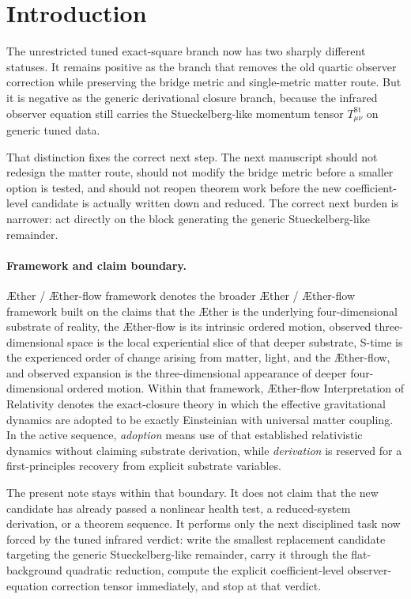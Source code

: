 \documentclass[11pt]{article}
\newcommand{\Aether}{\AE{}ther}
\newcommand{\Aflow}{\AE{}ther-flow}
\newcommand{\TheoryName}{\Aflow{} Interpretation of Relativity}
\newcommand{\TheoryProgram}{\Aether{} / \Aflow{} framework}
\begin{document}
\section{Introduction}

The unrestricted tuned exact-square branch now has two sharply different statuses. It remains positive as the branch that removes the old quartic observer correction while preserving the bridge metric and single-metric matter route. But it is negative as the generic derivational closure branch, because the infrared observer equation still carries the Stueckelberg-like momentum tensor \(T_{\mu\nu}^{\mathrm{St}}\) on generic tuned data.

That distinction fixes the correct next step. The next manuscript should not redesign the matter route, should not modify the bridge metric before a smaller option is tested, and should not reopen theorem work before the new coefficient-level candidate is actually written down and reduced. The correct next burden is narrower: act directly on the block generating the generic Stueckelberg-like remainder.

\paragraph{Framework and claim boundary.}
\TheoryProgram{} denotes the broader \Aether{} / \Aflow{} framework built on the claims that the \Aether{} is the underlying four-dimensional substrate of reality, the \Aflow{} is its intrinsic ordered motion, observed three-dimensional space is the local experiential slice of that deeper substrate, S-time is the experienced order of change arising from matter, light, and the \Aflow{}, and observed expansion is the three-dimensional appearance of deeper four-dimensional ordered motion. Within that framework, \TheoryName{} denotes the exact-closure theory in which the effective gravitational dynamics are adopted to be exactly Einsteinian with universal matter coupling. In the active sequence, \emph{adoption} means use of that established relativistic dynamics without claiming substrate derivation, while \emph{derivation} is reserved for a first-principles recovery from explicit substrate variables.

The present note stays within that boundary. It does not claim that the new candidate has already passed a nonlinear health test, a reduced-system derivation, or a theorem sequence. It performs only the next disciplined task now forced by the tuned infrared verdict: write the smallest replacement candidate targeting the generic Stueckelberg-like remainder, carry it through the flat-background quadratic reduction, compute the explicit coefficient-level observer-equation correction tensor immediately, and stop at that verdict.
\end{document}
